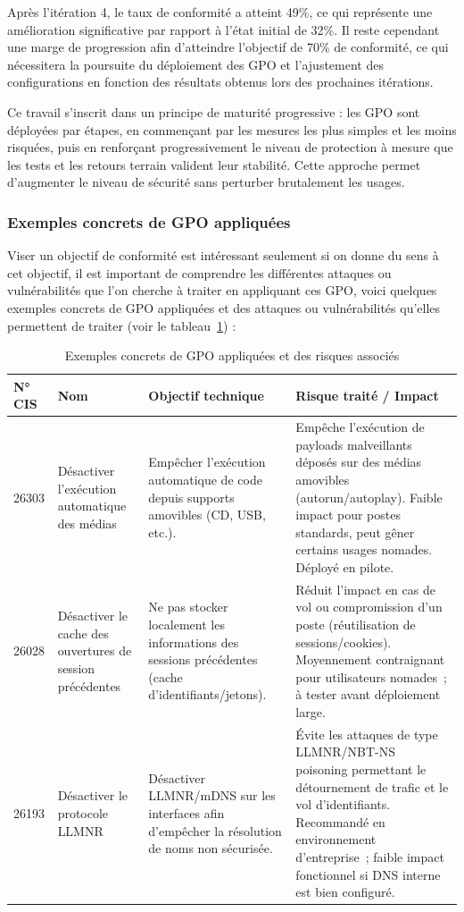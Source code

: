 \documentclass[a4paper, 11pt]{article}
\begin{document}
Après l'itération 4, le taux de conformité a atteint 49\%, ce qui représente une amélioration
 significative par rapport à l'état initial de 32\%. Il reste cependant une marge de progression afin d'atteindre
  l'objectif de 70\% de conformité, ce qui nécessitera la poursuite du déploiement des GPO et l'ajustement des
  configurations en fonction des résultats obtenus lors des prochaines itérations. 
  \par\bigskip
  Ce travail s'inscrit dans un
  principe de maturité progressive : les GPO sont déployées par étapes, en commençant par les mesures les plus
  simples et les moins risquées, puis en renforçant progressivement le niveau de protection à mesure que les tests
  et les retours terrain valident leur stabilité. Cette approche permet d'augmenter le niveau de sécurité sans
  perturber brutalement les usages.

\subsubsection{Exemples concrets de GPO appliquées}
Viser un objectif de conformité est intéressant seulement si on donne du sens à cet objectif, il est important
 de comprendre les différentes attaques ou vulnérabilités que l'on cherche à traiter en appliquant ces GPO,
  voici quelques exemples concrets de GPO appliquées et des attaques ou vulnérabilités qu'elles permettent de traiter (voir le tableau~\ref{tab:gpo_risques}) :\\

\begin{table}[H]
\centering
\renewcommand{\arraystretch}{1.4}
\begin{tabular}{|p{1.5cm}|p{3cm}|p{5.2cm}|p{5.2cm}|}
\hline
\textbf{N° CIS} & \textbf{Nom} & \textbf{Objectif technique} & \textbf{Risque traité / Impact} \\
\hline
 26303 
  & Désactiver l'exécution automatique des médias 
  & Empêcher l'exécution automatique de code depuis supports amovibles (CD, USB, etc.). 
  & Empêche l'exécution de payloads malveillants déposés sur des médias amovibles (autorun/autoplay). Faible impact pour postes standards, peut gêner certains usages nomades. Déployé en pilote. \\
\hline
 26028 
  & Désactiver le cache des ouvertures de session précédentes 
  & Ne pas stocker localement les informations des sessions précédentes (cache d'identifiants/jetons). 
  & Réduit l'impact en cas de vol ou compromission d'un poste (réutilisation de sessions/cookies). Moyennement contraignant pour utilisateurs nomades~; à tester avant déploiement large. \\
\hline
 26193 
  & Désactiver le protocole LLMNR 
  & Désactiver LLMNR/mDNS sur les interfaces afin d'empêcher la résolution de noms non sécurisée. 
  & Évite les attaques de type LLMNR/NBT-NS poisoning permettant le détournement de trafic et le vol d'identifiants. Recommandé en environnement d'entreprise~; faible impact fonctionnel si DNS interne est bien configuré. \\
\hline
\end{tabular}
\caption{Exemples concrets de GPO appliquées et des risques associés}
\label{tab:gpo_risques}
\end{table}
\end{document}
